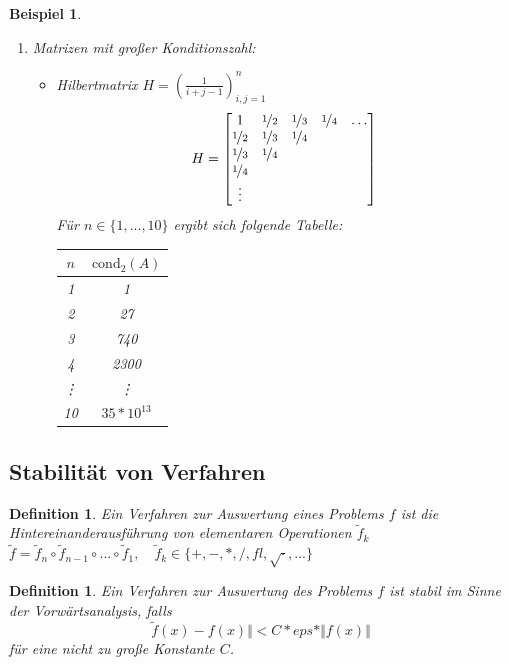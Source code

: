 \documentclass[12pt]{article}
\theoremstyle{break}
\newtheorem{definition}[theorem]{Definition}
\newtheorem{example}[theorem]{Beispiel}
\begin{document}
\begin{example}
\begin{enumerate}
  \item Matrizen mit großer Konditionszahl: 
    \begin{itemize}
      \item Hilbertmatrix $H = \left(\frac{1}{i+j-1}\right)_{i,j=1}^n$
        $$ H = \left[ \begin{matrix}1 & \nicefrac{1}{2} & \nicefrac{1}{3} & \nicefrac{1}{4} & \dots \\ \nicefrac{1}{2} & \nicefrac{1}{3} & \nicefrac{1}{4} \\ \nicefrac{1}{3} & \nicefrac{1}{4} \\ \nicefrac{1}{4} \\ \vdots \end{matrix} \right]$$
        Für $n \in \{1,..., 10\}$ ergibt sich folgende Tabelle:\\
        \begin{tabular}{c|c}
        $n$ & $\text{cond}_2(A)$ \\
        \hline
        1 & 1 \\
        2 & 27 \\
        3 & 740 \\
        4 & 2300 \\
        \vdots & \vdots \\
        10 & $35 * 10^{13}$
        \end{tabular}
    \end{itemize}
\end{enumerate}
\end{example}

\subsection{Stabilität von Verfahren}
\begin{definition}
Ein Verfahren zur Auswertung eines Problems $f$ ist die Hintereinanderausführung von elementaren Operationen $\tilde{f}_k$ \\
$\tilde{f} = \tilde{f}_n \circ \tilde{f}_{n-1} \circ ... \circ \tilde{f}_1, \quad \tilde{f}_k \in \{ +, -, *, /, fl, \sqrt{\cdot}, ...\} $
\end{definition}

\begin{definition}
Ein Verfahren zur Auswertung des Problems $f$ ist stabil im Sinne der Vorwärtsanalysis, falls 
$$\tilde{f}(x) - f(x) \Vert < C * eps *  \Vert f(x) \Vert$$
für eine nicht zu große Konstante $C$.
\end{definition}
\end{document}
